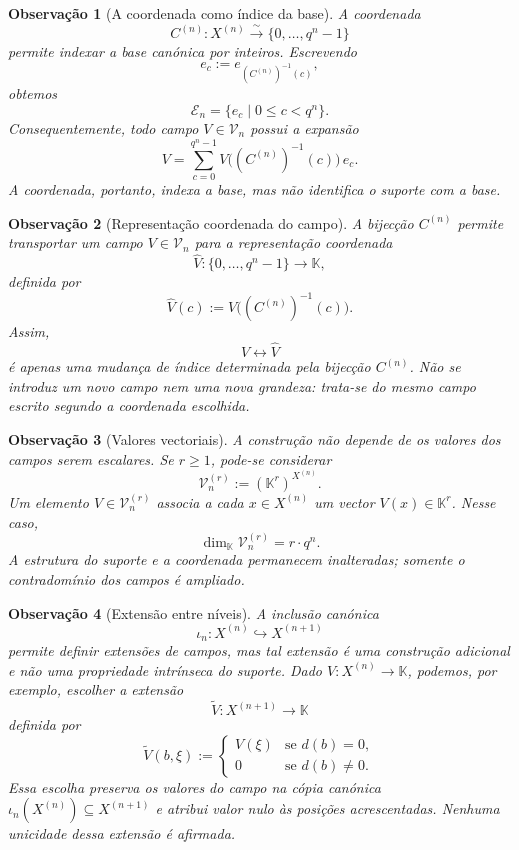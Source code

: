 \documentclass[11pt,a4paper]{article}
\newtheorem{observacao}{Observação}
\begin{document}
\begin{observacao}[A coordenada como índice da base]
\label{obs:coordenada-base}
A coordenada
\[
C^{(n)}\colon X^{(n)}\overset{\sim}{\longrightarrow}\{0,\dots,q^{n}-1\}
\]
permite indexar a base canónica por inteiros.
Escrevendo
\[
e_c
:=
e_{(C^{(n)})^{-1}(c)},
\]
obtemos
\[
\mathcal E_n
=
\{e_c\mid 0\le c<q^{n}\}.
\]
Consequentemente, todo campo \(V\in\mathcal V_n\) possui a expansão
\[
V
=
\sum_{c=0}^{q^{n}-1}
V\bigl((C^{(n)})^{-1}(c)\bigr)\,e_c.
\]
A coordenada, portanto, indexa a base, mas não identifica o suporte com a base.
\end{observacao}

\begin{observacao}[Representação coordenada do campo]
\label{obs:campo-coordenado}
A bijecção \(C^{(n)}\) permite transportar um campo \(V\in\mathcal V_n\) para a representação coordenada
\[
\widehat V
\colon
\{0,\dots,q^{n}-1\}
\to
\mathbb K,
\]
definida por
\[
\widehat V(c)
:=
V\bigl((C^{(n)})^{-1}(c)\bigr).
\]
Assim,
\[
V
\longleftrightarrow
\widehat V
\]
é apenas uma mudança de índice determinada pela bijecção \(C^{(n)}\).
Não se introduz um novo campo nem uma nova grandeza: trata-se do mesmo campo escrito segundo a coordenada escolhida.
\end{observacao}

\begin{observacao}[Valores vectoriais]
\label{obs:valores-vectoriais}
A construção não depende de os valores dos campos serem escalares.
Se \(r\ge 1\), pode-se considerar
\[
\mathcal V_n^{(r)}
:=
(\mathbb K^r)^{X^{(n)}}.
\]
Um elemento \(V\in\mathcal V_n^{(r)}\) associa a cada \(x\in X^{(n)}\) um vector \(V(x)\in\mathbb K^r\).
Nesse caso,
\[
\dim_{\mathbb K}\mathcal V_n^{(r)}
=
r\cdot q^{n}.
\]
A estrutura do suporte e a coordenada permanecem inalteradas; somente o contradomínio dos campos é ampliado.
\end{observacao}

\begin{observacao}[Extensão entre níveis]
\label{obs:extensao-campo}
A inclusão canónica
\[
\iota_n\colon X^{(n)}\hookrightarrow X^{(n+1)}
\]
permite definir extensões de campos, mas tal extensão é uma construção adicional e não uma propriedade intrínseca do suporte.
Dado \(V\colon X^{(n)}\to\mathbb K\), podemos, por exemplo, escolher a extensão
\[
\widetilde V\colon X^{(n+1)}\to\mathbb K
\]
definida por
\[
\widetilde V(b,\xi)
:=
\begin{cases}
V(\xi) & \text{se }d(b)=0,\\
0 & \text{se }d(b)\neq 0.
\end{cases}
\]
Essa escolha preserva os valores do campo na cópia canónica \(\iota_n(X^{(n)})\subseteq X^{(n+1)}\) e atribui valor nulo às posições acrescentadas.
Nenhuma unicidade dessa extensão é afirmada.
\end{observacao}
\end{document}
